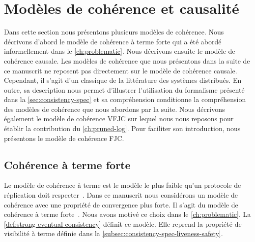 \section{Modèles de cohérence et causalité}\label{sec:causal-models}

Dans cette section nous présentons plusieurs modèles de cohérence.
Nous décrivons d'abord le modèle de cohérence à terme forte qui a été abordé informellement dans le \autoref{ch:problematic}.
Nous décrivons ensuite le modèle de cohérence causale.
Les modèles de cohérence que nous présentons dans la suite de ce manuscrit ne reposent pas directement sur le modèle de cohérence causale.
Cependant, il s'agit d'un classique de la littérature des systèmes distribués.
En outre, sa description nous permet d'illustrer l'utilisation du formalisme présenté dans la \autoref{sec:consistency-spec} et sa compréhension conditionne la compréhension des modèles de cohérence que nous abordons par la suite.
Nous décrivons également le modèle de cohérence \acf{VFJC} sur lequel nous nous reposons pour établir la contribution du \autoref{ch:pruned-log}.
Pour faciliter son introduction, nous présentons le modèle de cohérence \acf{FJC}.

\subsection{Cohérence à terme forte}\label{subsec:strong-eventual-consistency}

Le modèle de cohérence à terme est le modèle le plus faible qu'un protocole de réplication doit respecter~\autocite{saito_2005_optimisticreplication,burckhardt_eventualconsistency_2014}.
Dans ce manuscrit nous considérons un modèle de cohérence avec une propriété de convergence plus forte.
Il s'agit du modèle de cohérence à terme forte~\autocite{shapiro_2011_crdt,burckhardt_eventualconsistency_2014}.
Nous avons motivé ce choix dans le \autoref{ch:problematic}.
La \autoref{def:strong-eventual-consistency} définit ce modèle.
Elle reprend la propriété de visibilité à terme définie dans la \autoref{subsec:consistency-spec-liveness-safety}.

